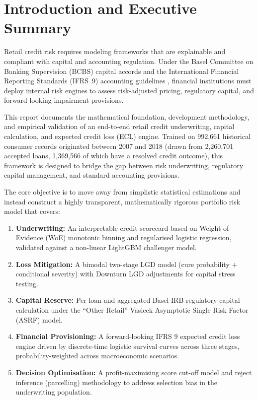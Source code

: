 \documentclass[11pt,a4paper]{article}
\begin{document}
\section{Introduction and Executive Summary}

Retail credit risk requires modeling frameworks that are explainable and compliant with capital and accounting regulation. Under the Basel Committee on Banking Supervision (BCBS) capital accords \parencite{bcbs2004} and the International Financial Reporting Standards (IFRS~9) accounting guidelines \parencite{iasb2014}, financial institutions must deploy internal risk engines to assess risk-adjusted pricing, regulatory capital, and forward-looking impairment provisions.

This report documents the mathematical foundation, development methodology, and empirical validation of an end-to-end retail credit underwriting, capital calculation, and expected credit loss (ECL) engine. Trained on 992,661 historical consumer records originated between 2007 and 2018 (drawn from 2,260,701 accepted loans, 1,369,566 of which have a resolved credit outcome), this framework is designed to bridge the gap between risk underwriting, regulatory capital management, and standard accounting provisions.

The core objective is to move away from simplistic statistical estimations and instead construct a highly transparent, mathematically rigorous portfolio risk model that covers:
\begin{enumerate}
    \item \textbf{Underwriting:} An interpretable credit scorecard based on Weight of Evidence (WoE) monotonic binning and regularised logistic regression, validated against a non-linear LightGBM challenger model.
    \item \textbf{Loss Mitigation:} A bimodal two-stage LGD model (cure probability + conditional severity) with Downturn LGD adjustments for capital stress testing.
    \item \textbf{Capital Reserve:} Per-loan and aggregated Basel IRB regulatory capital calculation under the ``Other Retail'' Vasicek Asymptotic Single Risk Factor (ASRF) model.
    \item \textbf{Financial Provisioning:} A forward-looking IFRS 9 expected credit loss engine driven by discrete-time logistic survival curves across three stages, probability-weighted across macroeconomic scenarios.
    \item \textbf{Decision Optimisation:} A profit-maximising score cut-off model and reject inference (parcelling) methodology to address selection bias in the underwriting population.
\end{enumerate}
\end{document}
